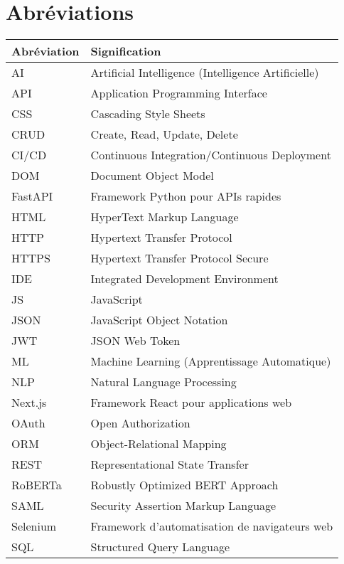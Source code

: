 \chapter*{Abréviations}

\begin{center}
\begin{tabularx}{\textwidth}{|l|X|}
\hline
\textbf{Abréviation} & \textbf{Signification} \\
\hline
AI & Artificial Intelligence (Intelligence Artificielle) \\
\hline
API & Application Programming Interface \\
\hline
CSS & Cascading Style Sheets \\
\hline
CRUD & Create, Read, Update, Delete \\
\hline
CI/CD & Continuous Integration/Continuous Deployment \\
\hline
DOM & Document Object Model \\
\hline
FastAPI & Framework Python pour APIs rapides \\
\hline
HTML & HyperText Markup Language \\
\hline
HTTP & Hypertext Transfer Protocol \\
\hline
HTTPS & Hypertext Transfer Protocol Secure \\
\hline
IDE & Integrated Development Environment \\
\hline
JS & JavaScript \\
\hline
JSON & JavaScript Object Notation \\
\hline
JWT & JSON Web Token \\
\hline
ML & Machine Learning (Apprentissage Automatique) \\
\hline
NLP & Natural Language Processing \\
\hline
Next.js & Framework React pour applications web \\
\hline
OAuth & Open Authorization \\
\hline
ORM & Object-Relational Mapping \\
\hline
REST & Representational State Transfer \\
\hline
RoBERTa & Robustly Optimized BERT Approach \\
\hline
SAML & Security Assertion Markup Language \\
\hline
Selenium & Framework d'automatisation de navigateurs web \\
\hline
SQL & Structured Query Language \\

\end{tabularx}
\end{center}
